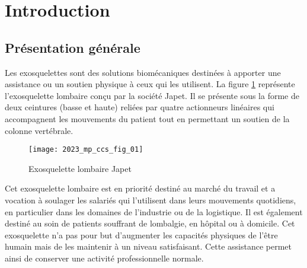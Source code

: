 %

%
%
%
%
%




\section{Introduction}
\subsection{Présentation générale} %
\ifprof
\else
Les exosquelettes sont des solutions biomécaniques destinées à apporter une assistance ou un soutien physique à ceux qui les utilisent. La figure \ref{ccs_mp_2023_fig_01} représente l'exosquelette lombaire conçu par la société Japet. Il se présente sous la forme de deux ceintures (basse et haute) reliées par quatre actionneurs linéaires qui accompagnent les mouvements du patient tout en permettant un soutien de la colonne vertébrale.
\



\begin{figure}[!h]
\centering
\texttt{[image: 2023\_mp\_ccs\_fig\_01]}
\caption{\label{ccs_mp_2023_fig_01}  Exosquelette lombaire Japet}
\end{figure}


Cet exosquelette lombaire est en priorité destiné au marché du travail et a vocation à soulager les salariés qui l'utilisent dans leurs mouvements quotidiens, en particulier dans les domaines de l'industrie ou de la logistique. Il est également destiné au soin de patients souffrant de lombalgie, en hôpital ou à domicile. Cet exosquelette n'a pas pour but d'augmenter les capacités physiques de l'être humain mais de les maintenir à un niveau satisfaisant. Cette assistance permet ainsi de conserver une activité professionnelle normale.

